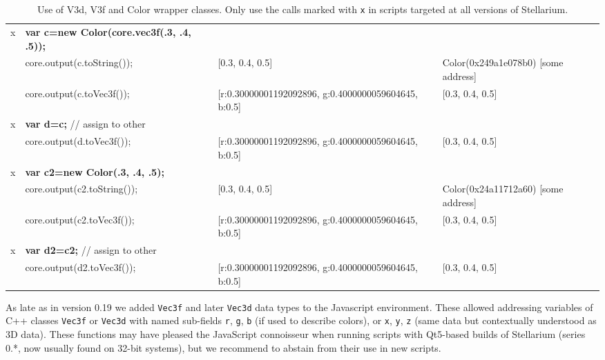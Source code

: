 \begin{sidewaystable}
{\begin{tabular}{rlll}
x&\textbf{var c=new Color(core.vec3f(.3, .4, .5));}      &                                                              &                                          \\
 &core.output(c.toString());                    &  [0.3, 0.4, 0.5]                                                      &  Color(0x249a1e078b0) [some address]     \\
 &core.output(c.toVec3f());                     &  [r:0.30000001192092896, g:0.4000000059604645, b:0.5]                 &  [0.3, 0.4, 0.5]                         \\
x&\textbf{var d=c;} // assign to other          &                                                                       &                                          \\
 &core.output(d.toVec3f());                     &  [r:0.30000001192092896, g:0.4000000059604645, b:0.5]                 &  [0.3, 0.4, 0.5]                         \\\hline
x&\textbf{var c2=new Color(.3, .4, .5);}        &                                                                       &                                          \\
 &core.output(c2.toString());                   &  [0.3, 0.4, 0.5]                                                      &  Color(0x24a11712a60) [some address]     \\
 &core.output(c2.toVec3f());                    &  [r:0.30000001192092896, g:0.4000000059604645, b:0.5]                 &  [0.3, 0.4, 0.5]                         \\
x&\textbf{var d2=c2;} // assign to other        &                                                                       &                                          \\
 &core.output(d2.toVec3f());                    &  [r:0.30000001192092896, g:0.4000000059604645, b:0.5]                 &  [0.3, 0.4, 0.5]                                            
\end{tabular}}
\caption{Use of V3d, V3f and Color wrapper classes. Only use the calls marked with \texttt{x} in scripts targeted at all versions of Stellarium.}
\label{tab:scripting:Vec3f}
\end{sidewaystable}



As late as in version 0.19 we added \texttt{Vec3f} and later \texttt{Vec3d} data types to the Javascript environment. 
These allowed addressing variables of C++ classes \texttt{Vec3f} or \texttt{Vec3d} with named sub-fields \texttt{r}, \texttt{g}, \texttt{b} 
(if used to describe colors), or \texttt{x}, \texttt{y}, \texttt{z} (same data but contextually understood as 3D data).
These functions may have pleased the JavaScript connoisseur when running scripts with Qt5-based builds of 
Stellarium (series 0.*, now usually found on 32-bit systems), but we recommend to abstain from their use in new scripts.

